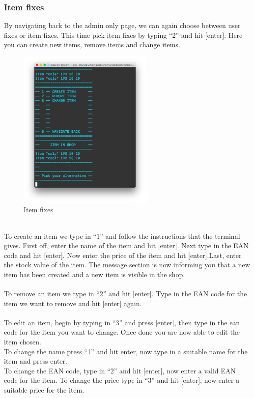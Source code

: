 \documentclass[11pt]{article}
\begin{document}
\subsubsection{Item fixes}
By navigating back to the admin only page, we can again choose between user fixes or item fixes. This time pick item fixes by typing “2” and hit [enter]. Here you can create new items, remove items and change items.
\\
\begin{figure}[h!]
  \includegraphics[width=250px]{interface9.png}
  \caption{Item fixes}
\end{figure}
\\
\newpage
To create an item we type in “1” and follow the instructions that the terminal gives. First off, enter the name of the item and hit [enter]. Next type in the EAN code and hit [enter]. Now enter the price of the item and hit [enter].Last, enter the stock value of the item. The message section is now informing you that a new item has been created and a new item is visible in the shop.\\\\
To remove an item we type in “2” and hit [enter]. Type in the EAN code for the item we want to remove and hit [enter] again.\\\\
To edit an item, begin by typing in “3” and press [enter], then type in the ean code for the item you want to change. Once done you are now able to edit the item chosen.\\
To change the name press “1” and hit enter, now type in a suitable name for the item and press enter.\\
To change the EAN code, type in “2” and hit [enter], now enter a valid EAN code for the item.
To change the price type in “3” and hit [enter], now enter a suitable price for the item.\\
\end{document}
